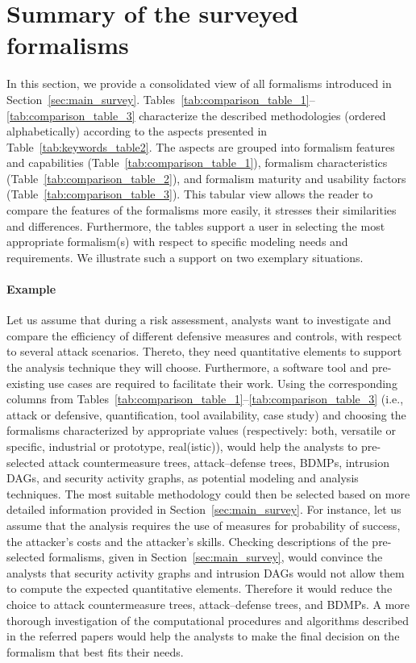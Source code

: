 \documentclass[a4paper]{article}
\begin{document}
\section{Summary of the surveyed formalisms}
\label{sec:table}

In this section, we provide a consolidated view of all formalisms introduced in
Section~\ref{sec:main_survey}.
Tables~\ref{tab:comparison_table_1}--\ref{tab:comparison_table_3} characterize
the described methodologies (ordered alphabetically) according to the  
aspects presented in Table~\ref{tab:keywords_table2}. The aspects are grouped 
into formalism features and capabilities (Table~\ref{tab:comparison_table_1}),
formalism  characteristics (Table~\ref{tab:comparison_table_2}), and formalism
maturity and usability factors (Table~\ref{tab:comparison_table_3}). This
tabular view allows the reader to compare the features of the formalisms more
easily, it stresses their similarities and differences. Furthermore, the tables
support a user in selecting the most appropriate formalism(s) with respect to
specific modeling needs and requirements. We illustrate such a support on two
exemplary situations. 


\paragraph{Example \theexmpl}

Let us assume that during a risk assessment, analysts want to investigate and
compare the efficiency of different defensive measures and controls, with
respect to several attack scenarios. Thereto, they need quantitative elements to
support the analysis technique they will choose. Furthermore, a software tool
and pre-existing use cases are required to facilitate their work. Using the
corresponding columns from 
Tables~\ref{tab:comparison_table_1}--\ref{tab:comparison_table_3} (i.e., attack 
or defensive, quantification, tool availability, case study) and choosing the
formalisms characterized by appropriate values (respectively: both, versatile or
specific, industrial or prototype, real(istic)), would help the analysts to
pre-selected attack countermeasure trees, attack--defense trees, BDMPs, 
intrusion DAGs, and security activity graphs, as potential modeling and analysis
techniques. The most suitable methodology could then be selected based on more
detailed information provided in Section~\ref{sec:main_survey}. For instance,
let us assume that the analysis requires the use of measures for probability of
success, the attacker's costs and the attacker's skills. Checking descriptions
of the pre-selected formalisms, given in Section~\ref{sec:main_survey}, would
convince the analysts that security activity graphs and intrusion DAGs would not
allow them to compute the expected quantitative elements. Therefore it would
reduce the choice to attack countermeasure trees, attack--defense trees, and
BDMPs. A more thorough investigation of the computational procedures and
algorithms described in the referred papers would help the analysts to make the
final decision on the formalism that best fits their needs. 
\end{document}
